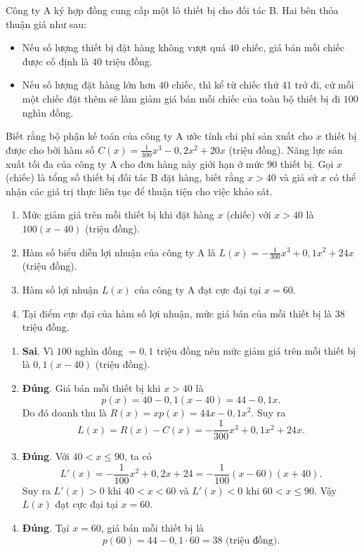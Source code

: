 \begin{baitap}
	Công ty A ký hợp đồng cung cấp một lô thiết bị cho đối tác B. Hai bên thỏa thuận giá như sau:
	\begin{itemize}
		\item Nếu số lượng thiết bị đặt hàng không vượt quá $40$ chiếc, giá bán mỗi chiếc được cố định là $40$ triệu đồng.
		\item Nếu số lượng đặt hàng lớn hơn $40$ chiếc, thì kể từ chiếc thứ $41$ trở đi, cứ mỗi một chiếc đặt thêm sẽ làm giảm giá bán mỗi chiếc của toàn bộ thiết bị đi $100$ nghìn đồng.
	\end{itemize}
	Biết rằng bộ phận kế toán của công ty A ước tính chi phí sản xuất cho $x$ thiết bị được cho bởi hàm số $C(x) = \frac{1}{300}x^3 - 0{,}2x^2 + 20x$ (triệu đồng). Năng lực sản xuất tối đa của công ty A cho đơn hàng này giới hạn ở mức $90$ thiết bị. Gọi $x$ (chiếc) là tổng số thiết bị đối tác B đặt hàng, biết rằng $x > 40$ và giả sử $x$ có thể nhận các giá trị thực liên tục để thuận tiện cho việc khảo sát. 
	\begin{enumerate}
		\item Mức giảm giá trên mỗi thiết bị khi đặt hàng $x$ (chiếc) với $x > 40$ là $100(x - 40)$ (triệu đồng).
		\item Hàm số biểu diễn lợi nhuận của công ty A là $L(x) = -\frac{1}{300}x^3 + 0{,}1x^2 + 24x$ (triệu đồng).
		\item Hàm số lợi nhuận $L(x)$ của công ty A đạt cực đại tại $x = 60$.
		\item Tại điểm cực đại của hàm số lợi nhuận, mức giá bán của mỗi thiết bị là $38$ triệu đồng.
	\end{enumerate}
	\begin{traloi}
		\begin{enumerate}
			\item \textbf{Sai}. Vì $100$ nghìn đồng $=0{,}1$ triệu đồng nên mức giảm giá trên mỗi thiết bị là
			$0{,}1(x-40)$ (triệu đồng).
			
			\item \textbf{Đúng}. Giá bán mỗi thiết bị khi $x>40$ là
			\[
			p(x)=40-0{,}1(x-40)=44-0{,}1x.
			\]
			Do đó doanh thu là $R(x)=xp(x)=44x-0{,}1x^2$. Suy ra
			\[
			L(x)=R(x)-C(x)
			=-\frac{1}{300}x^3+0{,}1x^2+24x.
			\]
			
			\item \textbf{Đúng}. Với $40<x\leq90$, ta có
			\[
			L'(x)=-\frac{1}{100}x^2+0{,}2x+24
			=-\frac{1}{100}(x-60)(x+40).
			\]
			Suy ra $L'(x)>0$ khi $40<x<60$ và $L'(x)<0$ khi $60<x\leq90$. Vậy $L(x)$ đạt cực đại tại $x=60$.
			
			\item \textbf{Đúng}. Tại $x=60$, giá bán mỗi thiết bị là
			\[
			p(60)=44-0{,}1\cdot60=38\text{ (triệu đồng).}
			\]
		\end{enumerate}
	\end{traloi}
\end{baitap}

